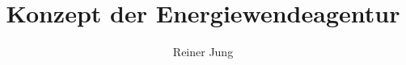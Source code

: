 \documentclass[a4paper, 11pt]{scrartcl}
\title{Konzept der Energiewendeagentur}
\author{Reiner Jung}
\begin{document}
\maketitle
\onehalfspacing





\end{document}
